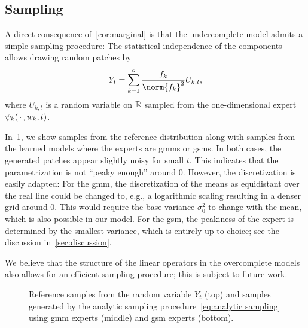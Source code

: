 \subsection{Sampling}%
\label{ssec:sampling}
A direct consequence of~\cref{cor:marginal} is that the undercomplete model admits a simple sampling procedure:
The statistical independence of the components allows drawing random patches by
\begin{equation}
	Y_t = \sum_{k=\num{1}}^\NumExperts \frac{\Filter_k}{\norm{\Filter_k}^{\num{2}}} U_{k, t},
	\label{eq:analytic sampling}
\end{equation}
where \( U_{k, t} \) is a random variable on \( \mathbb{R} \) sampled from the one-dimensional expert \( \psi_k(\,\cdot\,, w_k, t) \).

In~\cref{fig:patch generation results}, we show samples from the reference distribution along with samples from the learned models where the experts are \glspl{gmm} or \glspl{gsm}.
In both cases, the generated patches appear slightly noisy for small \( t \).
This indicates that the parametrization is not \enquote{peaky enough} around \num{0}.
However, the discretization is easily adapted:
For the \gls{gmm}, the discretization of the means as equidistant over the real line could be changed to, e.g., a logarithmic scaling resulting in a denser grid around \num{0}.
This would require the base-variance \( \sigma_{\num{0}}^{\num{2}} \) to change with the mean, which is also possible in our model.
For the \gls{gsm}, the peakiness of the expert is determined by the smallest variance, which is entirely up to choice; see the discussion in~\cref{sec:discussion}.

We believe that the structure of the linear operators in the overcomplete models also allows for an efficient sampling procedure; this is subject to future work.
\begin{figure}
	\centering
	\def\wwidth{3cm}
	\caption[Reference and generated patches at different noise levels]{%
		Reference samples from the random variable \( Y_t \) (top) and samples generated by the analytic sampling procedure~\eqref{eq:analytic sampling} using \gls{gmm} experts (middle) and \gls{gsm} experts (bottom).
	}%
	\label{fig:patch generation results}
\end{figure}
